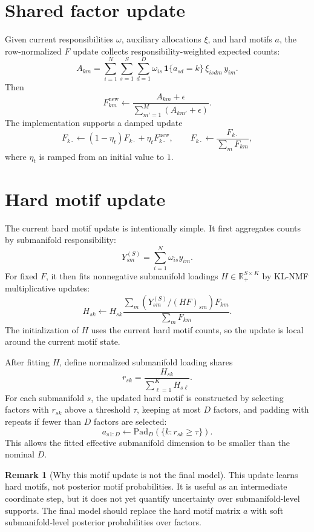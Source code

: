 \documentclass[11pt]{article}
\theoremstyle{definition}
\newtheorem{remark}{Remark}
\begin{document}
\section{Shared factor update}

Given current responsibilities $\omega$, auxiliary allocations $\xi$, and hard
motifs $a$, the row-normalized $F$ update collects responsibility-weighted
expected counts:
\[
  A_{km}
  =
  \sum_{i=1}^{N}\sum_{s=1}^{S}\sum_{d=1}^{D}
  \omega_{is}\,\mathbf{1}\{a_{sd}=k\}\,\xi_{isdm}\,y_{im}.
\]
Then
\[
  F^{\mathrm{new}}_{km}
  \leftarrow
  \frac{A_{km}+\epsilon}
       {\sum_{m'=1}^{M} (A_{km'}+\epsilon)}.
\]
The implementation supports a damped update
\[
  F_{k\cdot}
  \leftarrow
  (1-\eta_t)F_{k\cdot} + \eta_t F^{\mathrm{new}}_{k\cdot},
  \qquad
  F_{k\cdot} \leftarrow
  \frac{F_{k\cdot}}{\sum_m F_{km}},
\]
where $\eta_t$ is ramped from an initial value to $1$.

\section{Hard motif update}

The current hard motif update is intentionally simple. It first aggregates
counts by submanifold responsibility:
\[
  Y^{(S)}_{sm} = \sum_{i=1}^{N} \omega_{is} y_{im}.
\]
For fixed $F$, it then fits nonnegative submanifold loadings
$H \in \mathbb{R}_+^{S \times K}$ by KL-NMF multiplicative updates:
\[
  H_{sk}
  \leftarrow
  H_{sk}
  \frac{\sum_m (Y^{(S)}_{sm}/(HF)_{sm})F_{km}}
       {\sum_m F_{km}}.
\]
The initialization of $H$ uses the current hard motif counts, so the update is
local around the current motif state.

After fitting $H$, define normalized submanifold loading shares
\[
  r_{sk} = \frac{H_{sk}}{\sum_{\ell=1}^{K}H_{s\ell}}.
\]
For each submanifold $s$, the updated hard motif is constructed by selecting
factors with $r_{sk}$ above a threshold $\tau$, keeping at most $D$ factors, and
padding with repeats if fewer than $D$ factors are selected:
\[
  a_{s1:D}
  \leftarrow
  \mathrm{Pad}_D\left(
    \{k: r_{sk}\geq \tau\}
  \right).
\]
This allows the fitted effective submanifold dimension to be smaller than the
nominal $D$.

\begin{remark}[Why this motif update is not the final model]
This update learns hard motifs, not posterior motif probabilities. It is useful
as an intermediate coordinate step, but it does not yet quantify uncertainty
over submanifold-level supports. The final model should replace the hard motif
matrix $a$ with soft submanifold-level posterior probabilities over factors.
\end{remark}
\end{document}
